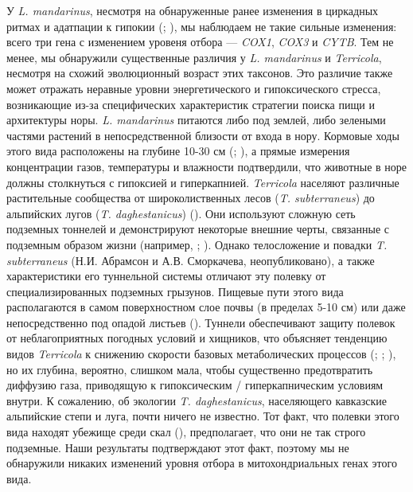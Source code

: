 У \textit{L. mandarinus}, несмотря на обнаруженные ранее изменения в циркадных ритмах и адатпации к гипокии (\cite{Sun2018}; \cite{Dong2020}), мы наблюдаем не такие сильные изменения: всего три гена с изменением уровеня отбора --- \textit{COX1}, \textit{COX3} и \textit{CYTB}. Тем не менее, мы обнаружили существенные различия у \textit{L. mandarinus} и \textit{Terricola}, несмотря на схожий эволюционный возраст этих таксонов. Это различие также может отражать неравные уровни энергетического и гипоксического стресса, возникающие из-за специфических характеристик стратегии поиска пищи и архитектуры норы. \textit{L. mandarinus} питаются либо под землей, либо зелеными частями растений в непосредственной близости от входа в нору. Кормовые ходы этого вида расположены на глубине 10-30 см (\cite{Smorkatcheva1990}; \cite{Hong2019}), а прямые измерения концентрации газов, температуры и влажности подтвердили, что животные в норе должны столкнуться с гипоксией и гиперкапнией. \textit{Terricola} населяют различные растительные сообщества от широколиственных лесов (\textit{T. subterraneus}) до альпийских лугов (\textit{T. daghestanicus}) (\cite{Aulagnier2018}). Они используют сложную сеть подземных тоннелей и демонстрируют некоторые внешние черты, связанные с подземным образом жизни (например, \cite{Aulagnier2018}; \cite{Mironov2020}). Однако телосложение и повадки \textit{T. subterraneus} (Н.И. Абрамсон и А.В. Сморкачева, неопубликовано), а также характеристики его туннельной системы отличают эту полевку от специализированных подземных грызунов. Пищевые пути этого вида располагаются в самом поверхностном слое почвы (в пределах 5-10 см) или даже непосредственно под опадой листьев (\cite{Mironov2020}). Туннели обеспечивают защиту полевок от неблагоприятных погодных условий и хищников, что объясняет тенденцию видов \textit{Terricola} к снижению скорости базовых метаболических процессов (\cite{Caroli2000}; \cite{Jemiolo1983}; \cite{Schropfer1977}), но их глубина, вероятно, слишком мала, чтобы существенно предотвратить диффузию газа, приводящую к гипоксическим / гиперкапническим условиям внутри. К сожалению, об экологии \textit{T. daghestanicus}, населяющего кавказские альпийские степи и луга, почти ничего не известно. Тот факт, что полевки этого вида находят убежище среди скал (\cite{Krystufek2005}), предполагает, что они не так строго подземные. Наши результаты подтверждают этот факт, поэтому мы не обнаружили никаких изменений уровня отбора в митохондриальных генах этого вида. 

